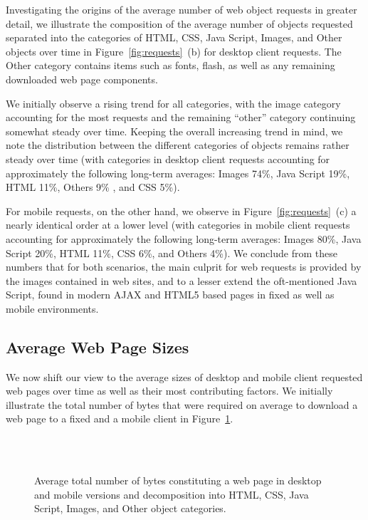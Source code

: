 \documentclass[onecolumn,12pt]{IEEEtran}
\begin{document}

Investigating the origins of the average number of web object requests in greater detail, we illustrate the composition of the average number of objects requested separated into the categories of HTML, CSS, Java Script, Images, and Other objects over time in Figure~\ref{fig:requests}~(b) for desktop client requests.
The Other category contains items such as fonts, flash, as well as any remaining downloaded web page components.

We initially observe a rising trend for all categories, with the image category accounting for the most requests and the remaining ``other'' category continuing somewhat steady over time.
Keeping the overall increasing trend in mind, we note the distribution between the different categories of objects remains rather steady over time (with categories in desktop client requests accounting for approximately the following long-term averages: Images 74\%, Java Script 19\%, HTML 11\%, Others 9\% , and CSS 5\%).

For mobile requests, on the other hand, we observe in Figure~\ref{fig:requests}~(c) a nearly identical order at a lower level (with categories in mobile client requests accounting for approximately the following long-term averages: Images 80\%, Java Script 20\%, HTML 11\%, CSS 6\%, and Others 4\%).
We conclude from these numbers that for both scenarios, the main culprit for web requests is provided by the images contained in web sites, and to a lesser extend the oft-mentioned Java Script, found in modern AJAX and HTML5 based pages in fixed as well as mobile environments.



\subsection{Average Web Page Sizes}
\label{ss:bytes}
We now shift our view to the average sizes of desktop and mobile client requested web pages over time as well as their most contributing factors.
We initially illustrate the total number of bytes that were required on average to download a web page to a fixed and a mobile client in Figure~\ref{fig:sizes}.
\begin{figure}
	\centering
	\\
	\qquad
	\\
	\caption{Average total number of bytes constituting a web page in desktop and mobile versions and decomposition into  HTML, CSS, Java Script, Images, and Other object categories.\label{fig:sizes}}
\end{figure}
\end{document}
